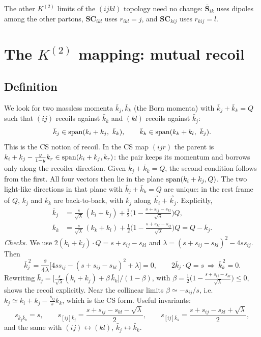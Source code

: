\documentclass[11pt,a4paper]{article}
\newcommand{\bbS}[1]{\bar{\mathbf S}_{#1}}
\newcommand{\bbSC}[1]{\bar{\mathbf{SC}}_{#1}}
\newcommand{\jb}{\bar k_{j}}
\newcommand{\kb}{\bar k_{k}}
\newcommand{\sqL}{\sqrt{\lambda}}
\begin{document}
The other $K^{(2)}$ limits of the $(ijkl)$ topology need no change:
$\bbS{ik}$ uses dipoles among the other partons, $\bbSC{ikl}$ uses $r_{ikl}=j$, and
$\bbSC{kij}$ uses $r_{kij}=l$.

\section{The $K^{(2)}$ mapping: mutual recoil}
\label{sec:map}

\subsection{Definition}
We look for two massless momenta $\jb,\kb$ (the Born momenta) with $\jb+\kb=Q$ such that
$(ij)$ recoils against $\kb$ and $(kl)$ recoils against $\jb$:
\begin{equation}
\jb\in{\rm span}(k_i+k_j,\ \kb),\qquad
\kb\in{\rm span}(k_k+k_l,\ \jb).
\end{equation}
This is the CS notion of recoil. In the CS map $(ijr)$ the parent is
$k_i+k_j-\frac{y}{1-y}k_r\in{\rm span}(k_i+k_j,k_r)$: the pair keeps its momentum and borrows
only along the recoiler direction. Given $\jb+\kb=Q$, the second condition follows from the
first. All four vectors then lie in the plane ${\rm span}(k_i+k_j,Q)$. The two light-like
directions in that plane with $\jb+\kb=Q$ are unique: in the rest frame of $Q$, $\jb$ and $\kb$
are back-to-back, with $\jb$ along $\vec k_i+\vec k_j$. Explicitly,
\begin{equation}
\boxed{\;\begin{aligned}
\jb&=\frac{s}{\sqL}\,(k_i+k_j)+\frac12\Big(1-\frac{s+s_{ij}-s_{kl}}{\sqL}\Big)Q,\\
\kb&=\frac{s}{\sqL}\,(k_k+k_l)+\frac12\Big(1-\frac{s+s_{kl}-s_{ij}}{\sqL}\Big)Q
=Q-\jb.
\end{aligned}\;}
\label{eq:map}
\end{equation}
\textit{Checks.} We use $2(k_i+k_j)\cdot Q=s+s_{ij}-s_{kl}$ and
$\lambda=(s+s_{ij}-s_{kl})^2-4ss_{ij}$. Then
\begin{equation}
\jb^{\,2}=\frac{s}{4\lambda}\Big[4ss_{ij}-(s+s_{ij}-s_{kl})^2+\lambda\Big]=0,\qquad
2\jb\cdot Q=s\ \Rightarrow\ \kb^{\,2}=0 .
\end{equation}
Rewriting $\jb=\big[\frac{s}{\sqL}(k_i+k_j)+\beta\,\kb\big]/(1-\beta)$, with
$\beta=\frac12\big(1-\frac{s+s_{ij}-s_{kl}}{\sqL}\big)\le0$, shows the recoil explicitly.
Near the collinear limits $\beta\simeq-s_{ij}/s$, i.e.\ $\jb\simeq k_i+k_j-\frac{s_{ij}}{s}\kb$,
which is the CS form. Useful invariants:
\begin{equation}
s_{\jb\kb}=s,\qquad
s_{[ij]\jb}=\frac{s+s_{ij}-s_{kl}-\sqL}{2},\qquad
s_{[ij]\kb}=\frac{s+s_{ij}-s_{kl}+\sqL}{2},
\end{equation}
and the same with $(ij)\leftrightarrow(kl)$, $\jb\leftrightarrow\kb$.
\end{document}
